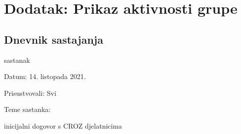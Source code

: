 \chapter*{Dodatak: Prikaz aktivnosti grupe}
		
		\section*{Dnevnik sastajanja}
		
		
		\begin{packed_enum}
			\item  sastanak
			
			\item[] \begin{packed_item}
				\item Datum: 14. listopada 2021.
				\item Prisustvovali: Svi
				\item Teme sastanka:
				\begin{packed_item}
					\item  inicijalni dogovor s CROZ djelatnicima
				\end{packed_item}
			\end{packed_item}
			

\end{packed_enum}
